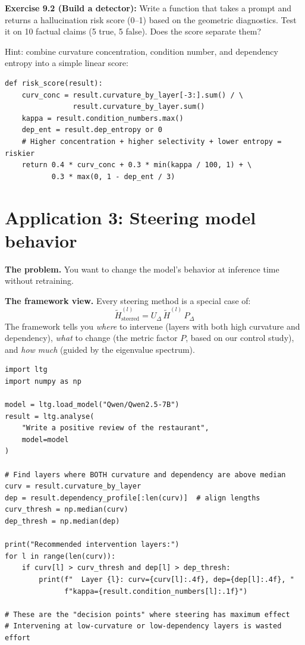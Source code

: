\documentclass[11pt, twoside, openright]{memoir}
\begin{document}
\begin{tryit}
\textbf{Exercise 9.2 (Build a detector):} Write a function that takes a
prompt and returns a hallucination risk score (0--1) based on the geometric
diagnostics. Test it on 10 factual claims (5 true, 5 false). Does the score
separate them?

Hint: combine curvature concentration, condition number, and dependency
entropy into a simple linear score:
\begin{lstlisting}
def risk_score(result):
    curv_conc = result.curvature_by_layer[-3:].sum() / \
                result.curvature_by_layer.sum()
    kappa = result.condition_numbers.max()
    dep_ent = result.dep_entropy or 0
    # Higher concentration + higher selectivity + lower entropy = riskier
    return 0.4 * curv_conc + 0.3 * min(kappa / 100, 1) + \
           0.3 * max(0, 1 - dep_ent / 3)
\end{lstlisting}
\end{tryit}

\section{Application 3: Steering model behavior}

\textbf{The problem.} You want to change the model's behavior at inference
time without retraining.

\textbf{The framework view.} Every steering method is a special case of:
\[
  \widetilde{H}^{(l)}_{\text{steered}}
  = U_\Delta \, \widetilde{H}^{(l)} \, P_\Delta
\]
The framework tells you \emph{where} to intervene (layers with both high
curvature and dependency), \emph{what} to change (the metric factor $P$,
based on our control study), and \emph{how much} (guided by the eigenvalue
spectrum).

\begin{lstlisting}[caption={Identifying intervention points for steering}]
import ltg
import numpy as np

model = ltg.load_model("Qwen/Qwen2.5-7B")
result = ltg.analyse(
    "Write a positive review of the restaurant",
    model=model
)

# Find layers where BOTH curvature and dependency are above median
curv = result.curvature_by_layer
dep = result.dependency_profile[:len(curv)]  # align lengths
curv_thresh = np.median(curv)
dep_thresh = np.median(dep)

print("Recommended intervention layers:")
for l in range(len(curv)):
    if curv[l] > curv_thresh and dep[l] > dep_thresh:
        print(f"  Layer {l}: curv={curv[l]:.4f}, dep={dep[l]:.4f}, "
              f"kappa={result.condition_numbers[l]:.1f}")

# These are the "decision points" where steering has maximum effect
# Intervening at low-curvature or low-dependency layers is wasted effort
\end{lstlisting}
\end{document}
